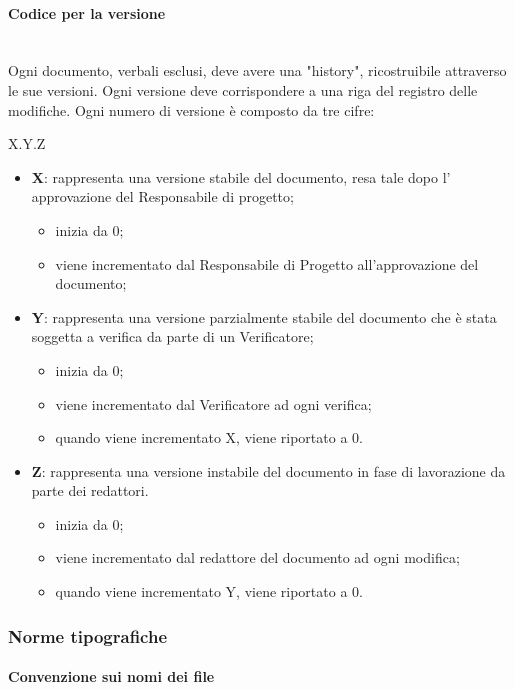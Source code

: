 		\paragraph{Codice per la versione} \mbox{}\\
		Ogni documento, verbali esclusi, deve avere una "history", ricostruibile attraverso le sue versioni. Ogni versione deve corrispondere a una riga del registro delle modifiche. Ogni numero di versione è composto da tre cifre:
		\begin{center}
			X.Y.Z
		\end{center}
		\begin{itemize}
			\item \textbf{X}: rappresenta una versione stabile del documento, resa tale dopo l' approvazione del Responsabile di progetto;
			\begin{itemize}
				\item inizia da 0;
				\item viene incrementato dal Responsabile di Progetto all’approvazione
				del documento;
			\end{itemize}
			\item \textbf{Y}: rappresenta una versione parzialmente stabile del documento che è stata soggetta a verifica da parte di un Verificatore;
			\begin{itemize}
				\item inizia da 0;
				\item viene incrementato dal Verificatore ad ogni verifica;
				\item quando viene incrementato X, viene riportato a 0.
			\end{itemize}
			\item \textbf{Z}: rappresenta una versione instabile del documento in fase di lavorazione da parte dei redattori.
			\begin{itemize}
				\item inizia da 0;
				\item viene incrementato dal redattore del documento ad ogni modifica;
				\item quando viene incrementato Y, viene riportato a 0.
			\end{itemize}			
		\end{itemize}
		\subsubsection{Norme tipografiche}
		\paragraph{Convenzione sui nomi dei file}
